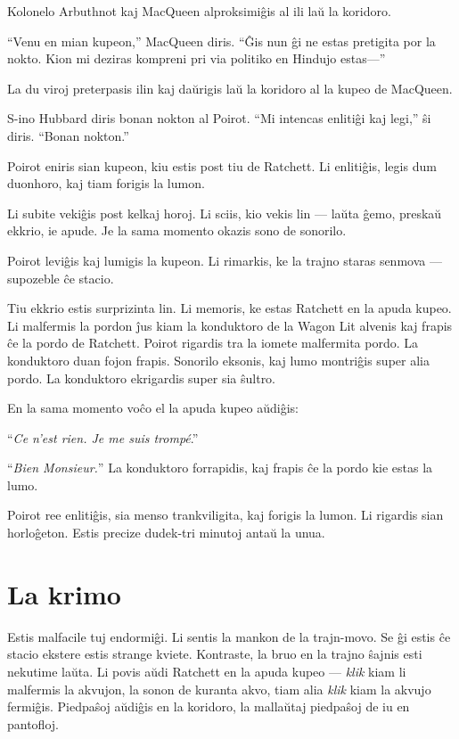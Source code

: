 Kolonelo Arbuthnot kaj MacQueen alproksimiĝis al ili laŭ la koridoro.

``Venu en mian kupeon,'' MacQueen diris. ``Ĝis nun ĝi ne estas pretigita por la nokto. Kion mi deziras kompreni pri via politiko en Hindujo estas---''

La du viroj preterpasis ilin kaj daŭrigis laŭ la koridoro al la kupeo de MacQueen.

S-ino Hubbard diris bonan nokton al Poirot. ``Mi intencas enlitiĝi kaj legi,'' ŝi diris. ``Bonan nokton.''

Poirot eniris sian kupeon, kiu estis post tiu de Ratchett. Li enlitiĝis, legis dum duonhoro, kaj tiam forigis la lumon.

\sectionbreak

Li subite vekiĝis post kelkaj horoj. Li sciis, kio vekis lin --- laŭta ĝemo, preskaŭ ekkrio, ie apude. Je la sama momento okazis sono de sonorilo.

Poirot leviĝis kaj lumigis la kupeon. Li rimarkis, ke la trajno staras senmova --- supozeble ĉe stacio.

Tiu ekkrio estis surprizinta lin. Li memoris, ke estas Ratchett en la apuda kupeo. Li malfermis la pordon ĵus kiam la konduktoro de la Wagon Lit alvenis kaj frapis ĉe la pordo de Ratchett. Poirot rigardis tra la iomete malfermita pordo. La konduktoro duan fojon frapis. Sonorilo eksonis, kaj lumo montriĝis super alia pordo. La konduktoro ekrigardis super sia ŝultro.

En la sama momento voĉo el la apuda kupeo aŭdiĝis:

``\emph{Ce n'est rien. Je me suis trompé}.''

``\emph{Bien Monsieur.}'' La konduktoro forrapidis, kaj frapis ĉe la pordo kie estas la lumo.

Poirot ree enlitiĝis, sia menso trankviligita, kaj forigis la lumon. Li rigardis sian horloĝeton. Estis precize dudek-tri minutoj antaŭ la unua.

\chapter[La krimo]{La krimo}


Estis malfacile tuj endormiĝi. Li sentis la mankon de la trajn-movo. Se ĝi estis ĉe stacio ekstere estis strange kviete. Kontraste, la bruo en la trajno ŝajnis esti nekutime laŭta. Li povis aŭdi Ratchett en la apuda kupeo --- \emph{klik} kiam li malfermis la akvujon, la sonon de kuranta akvo, tiam alia \emph{klik} kiam la akvujo fermiĝis. Piedpaŝoj aŭdiĝis en la koridoro, la mallaŭtaj piedpaŝoj de iu en pantofloj.

